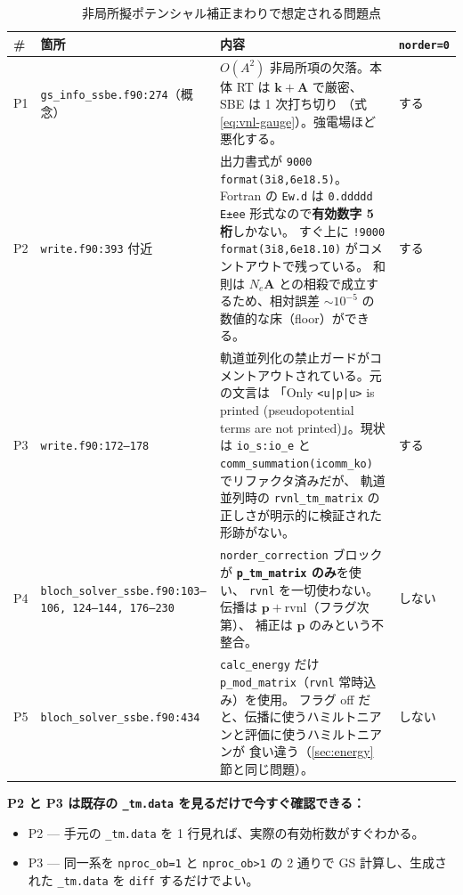 \documentclass[dvipdfmx,a4paper,11pt]{jsarticle}
\newcommand{\file}[1]{\texttt{#1}}
\newcommand{\vk}{\bm{k}}
\newcommand{\vA}{\bm{A}}
\newcommand{\vp}{\bm{p}}
\begin{document}
\begin{table}[htbp]
\centering
\caption{非局所擬ポテンシャル補正まわりで想定される問題点}
\label{tab:vnl-issues}
\begin{tabular}{@{}p{8mm}p{48mm}p{72mm}p{16mm}@{}}
\toprule
\textbf{\#} & \textbf{箇所} & \textbf{内容} & \file{norder}\newline\file{=0} \\
\midrule
P1 &
\file{gs\_info\_ssbe.f90:274}（概念） &
$O(A^2)$ 非局所項の欠落。本体 RT は $\vk+\vA$ で厳密、SBE は 1 次打ち切り
（式 \eqref{eq:vnl-gauge}）。強電場ほど悪化する。 &
する \\[3mm]

P2 &
\file{write.f90:393} 付近 &
出力書式が \verb|9000 format(3i8,6e18.5)|。Fortran の \verb|Ew.d| は
\verb|0.ddddd E±ee| 形式なので\textbf{有効数字 5 桁}しかない。
すぐ上に \verb|!9000 format(3i8,6e18.10)| がコメントアウトで残っている。
和則は $N_e \vA$ との相殺で成立するため、相対誤差 $\sim 10^{-5}$ の
数値的な床（floor）ができる。 &
する \\[3mm]

P3 &
\file{write.f90:172--178} &
軌道並列化の禁止ガードがコメントアウトされている。元の文言は
「Only \verb!<u|p|u>! is printed (pseudopotential terms are
not printed)」。現状は \file{io\_s:io\_e} と
\verb|comm_summation(icomm_ko)| でリファクタ済みだが、
軌道並列時の \file{rvnl\_tm\_matrix} の正しさが明示的に検証された形跡がない。 &
する \\[3mm]

P4 &
\file{bloch\_solver\_ssbe.f90}\newline\file{:103--106, 124--144, 176--230} &
\file{norder\_correction} ブロックが\textbf{ \file{p\_tm\_matrix} のみ}を使い、
\file{rvnl} を一切使わない。伝播は $\vp+\mathrm{rvnl}$（フラグ次第）、
補正は $\vp$ のみという不整合。 &
しない \\[3mm]

P5 &
\file{bloch\_solver\_ssbe.f90:434} &
\verb|calc_energy| だけ \file{p\_mod\_matrix}（\file{rvnl} 常時込み）を使用。
フラグ off だと、伝播に使うハミルトニアンと評価に使うハミルトニアンが
食い違う（\ref{sec:energy} 節と同じ問題）。 &
しない \\
\bottomrule
\end{tabular}
\end{table}

\textbf{P2 と P3 は既存の \file{\_tm.data} を見るだけで今すぐ確認できる：}
\begin{itemize}
\item P2 --- 手元の \file{\_tm.data} を 1 行見れば、実際の有効桁数がすぐわかる。
\item P3 --- 同一系を \file{nproc\_ob=1} と \file{nproc\_ob>1} の 2 通りで
      GS 計算し、生成された \file{\_tm.data} を \verb|diff| するだけでよい。
\end{itemize}
\end{document}
